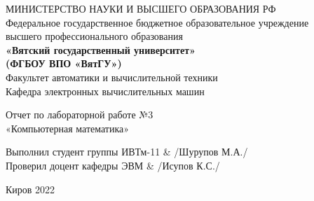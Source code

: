\thispagestyle{empty}
\begin{center}
    МИНИСТЕРСТВО НАУКИ И ВЫСШЕГО ОБРАЗОВАНИЯ РФ\\
    Федеральное государственное бюджетное образовательное учреждение\\
    высшего профессионального образования\\
    {\bf«Вятский государственный университет»}\\
    {\bf(ФГБОУ ВПО «ВятГУ»)}\\
    Факультет автоматики и вычислительной техники\\
    Кафедра электронных вычислительных машин
\end{center}
\vfill %
\begin{center}
    Отчет по лабораторной работе №3\\
    «Компьютерная математика»
\end{center}

\vfill
\begin{flushleft}
    Выполнил студент группы ИВТм-11 & \hrulefill /Шурупов М.А./\\
    Проверил доцент кафедры ЭВМ & \hrulefill  /Исупов К.С./
\end{flushleft}
\vfill %

\begin{center}
    Киров 2022
\end{center}
\newpage